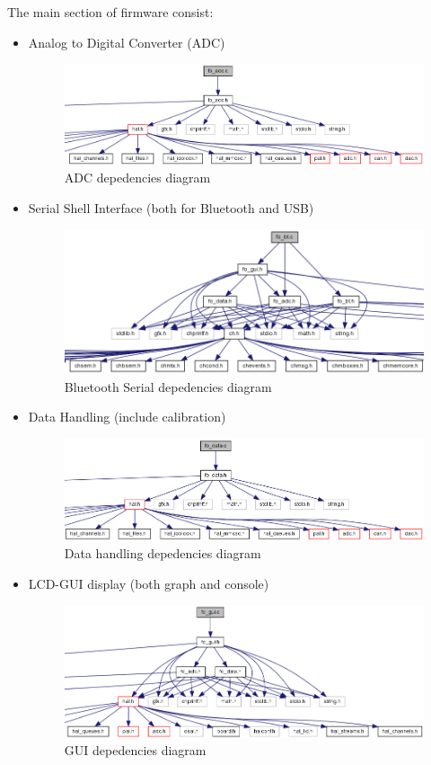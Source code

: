 \documentclass[12pt,]{book}
\begin{document}
	The main section of firmware consist:
	\begin{itemize}
		\item Analog to Digital Converter (ADC)
		\begin{figure}[H]
			\centering
			\includegraphics[width=\linewidth]{images/jw_ch_adc}
			\caption{ADC depedencies diagram}
		\end{figure}
	
		\newpage
		\item Serial Shell Interface (both for Bluetooth and USB)
		\begin{figure}[H]
			\centering
			\includegraphics[width=\linewidth]{images/jw_ch_bt}
			\caption{Bluetooth Serial depedencies diagram}
		\end{figure}
		\item Data Handling (include calibration)
		\begin{figure}[H]
			\centering
			\includegraphics[width=\linewidth]{images/jw_ch_data}
			\caption{Data handling depedencies diagram}
		\end{figure}
		\item LCD-GUI display (both graph and console)
		\begin{figure}[H]
			\centering
			\includegraphics[width=\linewidth]{images/jw_ch_gui}
			\caption{GUI depedencies diagram}
		\end{figure}		
	\end{itemize}
	
\end{document}
